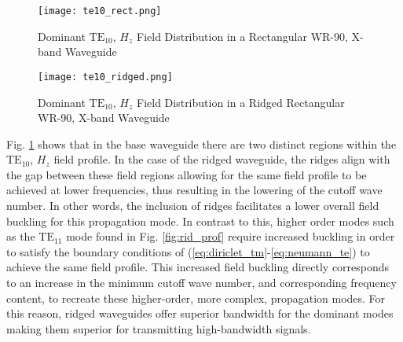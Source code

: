 \begin{figure}[h!]  
	\centering
	\texttt{[image: te10\_rect.png]} 
	\caption{Dominant $\mathrm{TE_{10}}$, $H_z$ Field Distribution in a Rectangular WR-90, X-band Waveguide}
	\label{fig:rec_te10}
\end{figure}

\begin{figure}[h!]  
	\centering
	\texttt{[image: te10\_ridged.png]} 
	\caption{Dominant $\mathrm{TE_{10}}$, $H_z$ Field Distribution in a Ridged Rectangular WR-90, X-band Waveguide}
	\label{fig:rid_te10}
\end{figure}

Fig. \ref{fig:rec_te10} shows that in the base waveguide there are two distinct regions within the $\mathrm{TE}_{10}$, $H_z$ field profile. In the case of the ridged waveguide, the ridges align with the gap between these field regions allowing for the same field profile to be achieved at lower frequencies, thus resulting in the lowering of the cutoff wave number. In other words, the inclusion of ridges facilitates a lower overall field buckling for this propagation mode. In contrast to this, higher order modes such as the $\mathrm{TE}_{11}$ mode found in Fig. \ref{fig:rid_prof} require increased buckling in order to satisfy the boundary conditions of (\ref{eq:diriclet_tm}-\ref{eq:neumann_te}) to achieve the same field profile. This increased field buckling directly corresponds to an increase in the minimum cutoff wave number, and corresponding frequency content, to recreate these higher-order, more complex, propagation modes. For this reason, ridged waveguides offer superior bandwidth for the dominant modes making them superior for transmitting high-bandwidth signals.   
